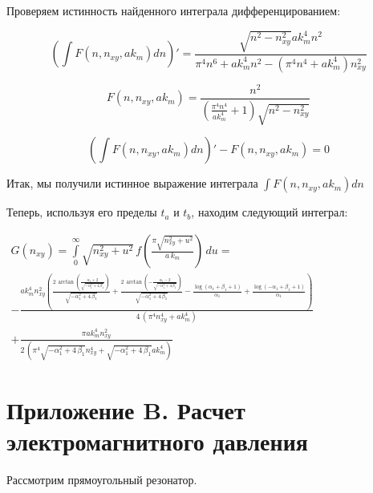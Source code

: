 \documentclass[11pt]{article}
\begin{document}
    Проверяем истинность найденного интеграла дифференцированием:

    \[\left( \int F\left(n, n_{xy}, ak_m\right) dn \right)' = \frac{\sqrt{n^{2} - n_{\mathit{xy}}^{2}} \mathit{ak}_{m}^{4} n^{2}}{\pi^{4} n^{6} + \mathit{ak}_{m}^{4} n^{2} - {\left(\pi^{4} n^{4} + \mathit{ak}_{m}^{4}\right)} n_{\mathit{xy}}^{2}}\]

\[F\left(n, n_{xy}, ak_m\right)= \frac{n^{2}}{{\left(\frac{\pi^{4} n^{4}}{\mathit{ak}_{m}^{4}} + 1\right)} \sqrt{n^{2} - n_{\mathit{xy}}^{2}}}\]

\[\left( \int F\left(n, n_{xy}, ak_m\right) dn \right)'-F\left(n, n_{xy}, ak_m\right) = 0\]

    Итак, мы получили истинное выражение интеграла
\(\int F\left(n, n_{xy}, ak_m\right) dn\)

Теперь, используя его пределы \(t_a\) и \(t_b\), находим следующий
интеграл:

    \(\begin{array}{r}  G\left(n_{xy}\right) = \int\limits_{0}^{\infty}\sqrt{n_{xy}^2+u^2}\, f\left(\frac{\pi\sqrt{n_{xy}^2+u^2}}{a\,k_m}\right)\,d{u} = \\  -\frac{\mathit{ak}_{m}^{4} n_{\mathit{xy}}^{2} {\left(\frac{2 \, \arctan\left(\frac{\alpha_{1} + 2}{\sqrt{-\alpha_{1}^{2} + 4 \, \beta_{1}}}\right)}{\sqrt{-\alpha_{1}^{2} + 4 \, \beta_{1}}} + \frac{2 \, \arctan\left(-\frac{\alpha_{1} - 2}{\sqrt{-\alpha_{1}^{2} + 4 \, \beta_{1}}}\right)}{\sqrt{-\alpha_{1}^{2} + 4 \, \beta_{1}}} - \frac{\log\left(\alpha_{1} + \beta_{1} + 1\right)}{\alpha_{1}} + \frac{\log\left(-\alpha_{1} + \beta_{1} + 1\right)}{\alpha_{1}}\right)}}{4 \, {\left(\pi^{4} n_{\mathit{xy}}^{4} + \mathit{ak}_{m}^{4}\right)}} \\ +\frac{\pi \mathit{ak}_{m}^{4} n_{\mathit{xy}}^{2}}{2 \, {\left(\pi^{4} \sqrt{-\alpha_{1}^{2} + 4 \, \beta_{1}} n_{\mathit{xy}}^{4} + \sqrt{-\alpha_{1}^{2} + 4 \, \beta_{1}} \mathit{ak}_{m}^{4}\right)}} \end{array}\)

    \section{Приложение B. Расчет электромагнитного
давления}\label{ux43fux440ux438ux43bux43eux436ux435ux43dux438ux435-b.-ux440ux430ux441ux447ux435ux442-ux44dux43bux435ux43aux442ux440ux43eux43cux430ux433ux43dux438ux442ux43dux43eux433ux43e-ux434ux430ux432ux43bux435ux43dux438ux44f}

    Рассмотрим прямоугольный резонатор.
\end{document}
